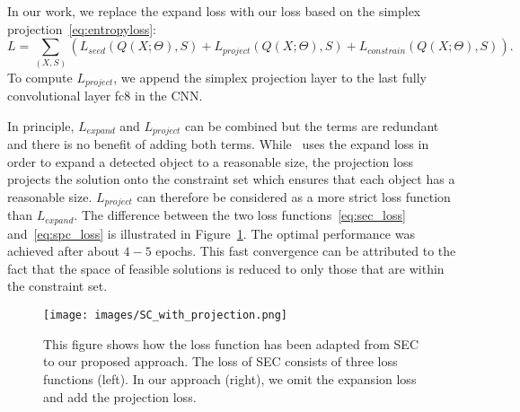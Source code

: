\documentclass{bmvc2k}
\begin{document}
	In our work, we replace the expand loss with our loss based on the simplex projection~\eqref{eq:entropyloss}: 
\begin{equation}
			L=\sum_{(X,S)}\left( L_{seed}(Q(X;\Theta),S)+L_{project}(Q(X;\Theta),S)+L_{constrain}(Q(X;\Theta),S) \right).
			\label{eq:spc_loss}
\end{equation}
To compute $L_{project}$, we append the simplex projection layer to the last fully convolutional layer fc8 in the CNN. 

In principle, $L_{expand}$ and $L_{project}$ can be combined but the terms are redundant and there is no benefit of adding both terms. While~\cite{kolesnikov2016seed} uses the expand loss in order to expand a detected object to a reasonable size, the projection loss projects the solution onto the constraint set which ensures that each object has a reasonable size. $L_{project}$ can therefore be considered as a more strict loss function than $L_{expand}$. The difference between the two loss functions~\eqref{eq:sec_loss} and~\eqref{eq:spc_loss} is illustrated in Figure~\ref{SC_projection}.
The optimal performance was achieved after about $4-5$ epochs. This fast convergence can be attributed to the fact that the space of feasible solutions is reduced to only those that are within the constraint set.

	\begin{figure}[t]
		\centering
		\texttt{[image: images/SC\_with\_projection.png]}
		\caption{This figure shows how the loss function has been adapted from SEC to our proposed approach. The loss of SEC consists of three loss functions (left). In our approach (right), we omit the expansion loss and add the projection loss.}
		\label{SC_projection}
	\end{figure} 	
\end{document}
